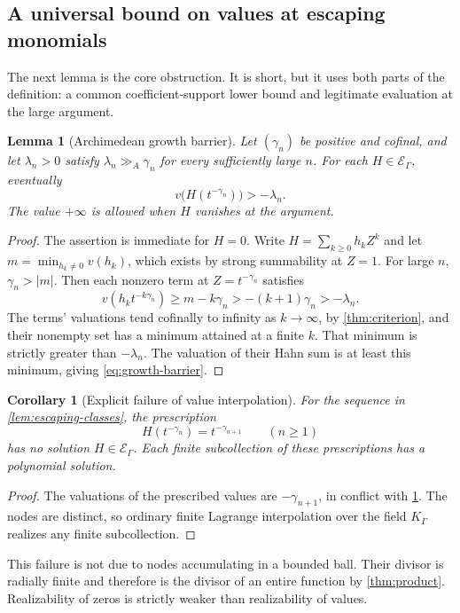 \documentclass[11pt]{article}
\theoremstyle{plain}
\newtheorem{lemma}[lemma]{Lemma}
\theoremstyle{plain}
\theoremstyle{plain}
\newtheorem{corollary}[corollary]{Corollary}
\theoremstyle{definition}
\theoremstyle{definition}
\theoremstyle{definition}
\theoremstyle{remark}
\newcommand{\K}{K_\Gamma}\newcommand{\E}{\mathcal E_\Gamma}
\newcommand{\ggA}{\mathrel{\gg_{\!A}}}
\begin{document}
\subsection{A universal bound on values at escaping monomials}
The next lemma is the core obstruction. It is short, but it uses both
parts of the definition: a common coefficient-support lower bound and
legitimate evaluation at the large argument.

\begin{lemma}[Archimedean growth barrier]\label{lem:growth-barrier}
Let $(\gamma_n)$ be positive and cofinal, and let
$\lambda_n>0$ satisfy $\lambda_n\ggA\gamma_n$ for every sufficiently
large $n$. For each $H\in\E$, eventually
\begin{equation}\label{eq:growth-barrier}
 v\bigl(H(t^{-\gamma_n})\bigr)>-\lambda_n.
\end{equation}
The value $+\infty$ is allowed when $H$ vanishes at the argument.
\end{lemma}
\begin{proof}
The assertion is immediate for $H=0$. Write $H=\sum_{k\ge0}h_kZ^k$
and let $m=\min_{h_k\ne0}v(h_k)$, which exists by strong summability
at $Z=1$. For large $n$, $\gamma_n>|m|$. Then each nonzero term at
$Z=t^{-\gamma_n}$ satisfies
\[
 v(h_kt^{-k\gamma_n})\ge m-k\gamma_n
      >-(k+1)\gamma_n>-\lambda_n.
\]
The terms' valuations tend cofinally to infinity as $k\to\infty$,
by \cref{thm:criterion}, and their nonempty set has a minimum attained
at a finite $k$. That minimum is strictly greater than $-\lambda_n$.
The valuation of their Hahn sum is at least this minimum, giving
\eqref{eq:growth-barrier}.
\end{proof}

\begin{corollary}[Explicit failure of value interpolation]
\label{cor:no-interpolation}
For the sequence in \cref{lem:escaping-classes}, the prescription
\[
 H(t^{-\gamma_n})=t^{-\gamma_{n+1}}\qquad(n\ge1)
\]
has no solution $H\in\E$. Each finite subcollection of these
prescriptions has a polynomial solution.
\end{corollary}
\begin{proof}
The valuations of the prescribed values are $-\gamma_{n+1}$, in
conflict with \cref{lem:growth-barrier}. The nodes are distinct, so
ordinary finite Lagrange interpolation over the field $\K$ realizes
any finite subcollection.
\end{proof}

This failure is not due to nodes accumulating in a bounded ball.
Their divisor is radially finite and therefore is the divisor of an
entire function by \cref{thm:product}. Realizability of zeros is strictly
weaker than realizability of values.
\end{document}

